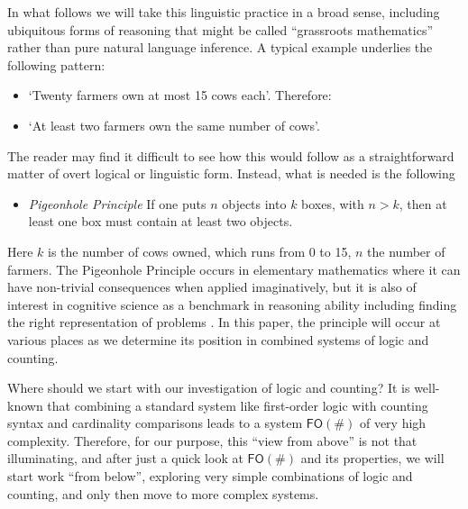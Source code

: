 \documentclass[12pt,oneside,reqno]{amsart}
\theoremstyle{definition}
\begin{document}
In what follows we will take this linguistic practice in a broad sense, including ubiquitous forms of reasoning that might be called ``grassroots mathematics'' rather than pure natural language inference. A typical example underlies the  following pattern:
\vspace{0.5ex}
\begin{itemize}
\item[] `Twenty farmers own at most 15 cows each'. Therefore: 
\item[] `At least two farmers own the same number of cows'.
\end{itemize}
\vspace{0.5ex}
The reader may find it difficult to see how this would follow as a straightforward matter of overt logical or linguistic form. Instead, what is needed is the following
\vspace{-1ex}
\begin{itemize}
    \item[]\emph{Pigeonhole Principle} \quad If one puts $n$ objects into $k$ boxes, with $n > k$, then  at least one box must contain at least two objects.
\end{itemize}
\vspace{-1ex}
Here $k$ is the number of cows owned, which runs from 0 to 15,  $n$ the number of farmers. The Pigeonhole Principle occurs in elementary mathematics where it can have non-trivial consequences when applied imaginatively, but it is also of interest in cognitive science as a benchmark in reasoning ability including finding the right representation of problems \citep{Sperber}. In this paper, the  principle 
will occur at various places  as we determine its position in combined systems of logic and counting. 

\vspace{1ex}

Where should we start with our investigation of logic and counting?  It is well-known that combining a standard system like first-order logic with counting syntax and cardinality comparisons leads to a system $\mathsf{FO}(\#)$ of very high complexity. Therefore, for our purpose, this ``view from above'' is not that illuminating, and after just a quick look at $\mathsf{FO}(\#)$ and its properties, we will start work ``from below'', exploring very simple combinations of logic and counting, and only then move to more complex systems.

\vspace{1ex}
\end{document}
